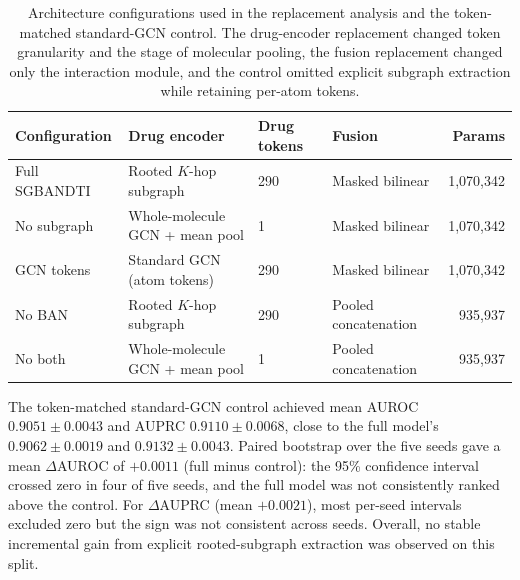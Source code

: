 \documentclass[computers,article,submit,moreauthors]{Definitions/mdpi}
\begin{document}
\begin{table}[H]
\caption{Architecture configurations used in the replacement analysis and the token-matched standard-GCN control. The drug-encoder replacement changed token granularity and the stage of molecular pooling, the fusion replacement changed only the interaction module, and the control omitted explicit subgraph extraction while retaining per-atom tokens.}
\label{tab:replacement_configs}
\footnotesize
\begin{tabular*}{\textwidth}{@{\extracolsep{\fill}}llllr@{}}
\toprule
\textbf{Configuration} & \textbf{Drug encoder} & \textbf{Drug tokens} & \textbf{Fusion} & \textbf{Params} \\
\midrule
Full SGBANDTI & Rooted $K$-hop subgraph & 290 & Masked bilinear & 1,070,342 \\
No subgraph & Whole-molecule GCN + mean pool & 1 & Masked bilinear & 1,070,342 \\
GCN tokens & Standard GCN (atom tokens) & 290 & Masked bilinear & 1,070,342 \\
No BAN & Rooted $K$-hop subgraph & 290 & Pooled concatenation & 935,937 \\
No both & Whole-molecule GCN + mean pool & 1 & Pooled concatenation & 935,937 \\
\bottomrule
\end{tabular*}
\end{table} The token-matched standard-GCN control achieved mean AUROC $0.9051 \pm 0.0043$ and AUPRC $0.9110 \pm 0.0068$, close to the full model's $0.9062 \pm 0.0019$ and $0.9132 \pm 0.0043$. Paired bootstrap over the five seeds gave a mean $\Delta$AUROC of $+0.0011$ (full minus control): the 95\% confidence interval crossed zero in four of five seeds, and the full model was not consistently ranked above the control. For $\Delta$AUPRC (mean $+0.0021$), most per-seed intervals excluded zero but the sign was not consistent across seeds. Overall, no stable incremental gain from explicit rooted-subgraph extraction was observed on this split.
\end{document}

